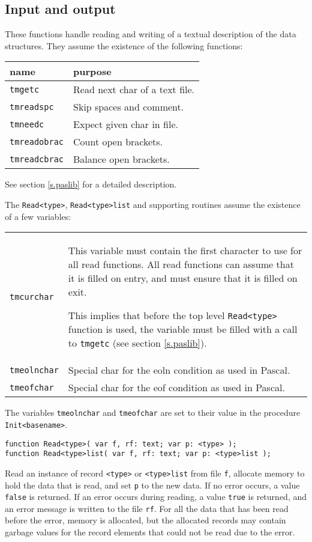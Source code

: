\documentclass{article}
\makeatletter
\newcommand{\Pascal}{\sf Pascal}
\newenvironment{desc}{\nopagebreak\vspace{-\bigskipamount}\vspace{-\parskip}\begin{list}{}{\setlength{\topsep}{0pt}\setlength{\rightmargin}{0pt}}\item[]}{\end{list}}
\newlength{\descwidth}
\newenvironment{desctab}{\begin{tabular*}{\textwidth}{l@{\extracolsep{\fill}}p{\descwidth}}}{\end{tabular*}}
\makeatother
\begin{document}
\subsection{Input and output}
These functions handle reading and writing of a textual description of the
data structures.
They assume the existence of the following functions:
\begin{flushleft}
\begin{tabular}{ll}
name & purpose \\
\hline
{\tt tmgetc} &  Read next char of a text file. \\
{\tt tmreadspc} & Skip spaces and comment. \\
{\tt tmneedc} & Expect given char in file. \\
{\tt tmreadobrac} & Count open brackets. \\
{\tt tmreadcbrac} & Balance open brackets. \\
\end{tabular}
\end{flushleft}
See section \ref{s.paslib} for a detailed description.
\par
The {\tt Read<type>}, {\tt Read<type>list} and supporting routines
assume the existence of a few variables:
\begin{flushleft}
\begin{desctab}
{\tt tmcurchar}
&
This variable must contain the first character to use for all read
functions.
All read functions can assume that it is filled on entry,
and must ensure that it is filled on exit.
\par
This implies that before the top level {\tt Read<type>} function is used,
the variable must be filled with a call to {\tt tmgetc}
(see section \ref{s.paslib}).
\\
{\tt tmeolnchar}
&
Special char for the eoln condition as used in {\Pascal}.
\\
{\tt tmeofchar}
&
Special char for the eof condition as used in {\Pascal}.
\end{desctab}
\end{flushleft}
\par
The variables {\tt tmeolnchar} and {\tt tmeofchar} are
set to their value in the procedure {\tt Init<basename>}.
\begin{verbatim}
function Read<type>( var f, rf: text; var p: <type> );
function Read<type>list( var f, rf: text; var p: <type>list );
\end{verbatim}
\begin{desc}
Read an instance of record {\tt <type>} or {\tt <type>list} from
file {\tt f},
allocate memory to hold the data that is read,
and set {\tt p} to the new data.
If no error occurs, a value {\tt false} is returned.
If an error occurs during reading,
a value {\tt true} is returned, and an error message is written
to the file {\tt rf}.
For all the data that has been read before the error, memory is allocated,
but the allocated records may contain garbage values for the record
elements that could not be read due to the error.
\end{desc}
\end{document}
